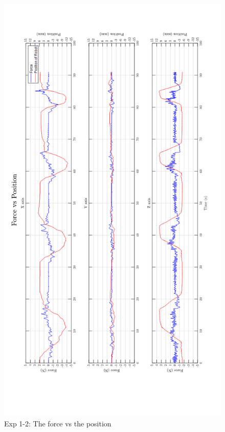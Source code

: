 \begin{figure}[htbp]
\begin{center}
\includegraphics[width=1\linewidth]{Images/exp/exp1_2_3.png}
\caption{Exp 1-2: The force vs the position}
\label{fig: exp1_2_3}
\end{center}
\end{figure}	
